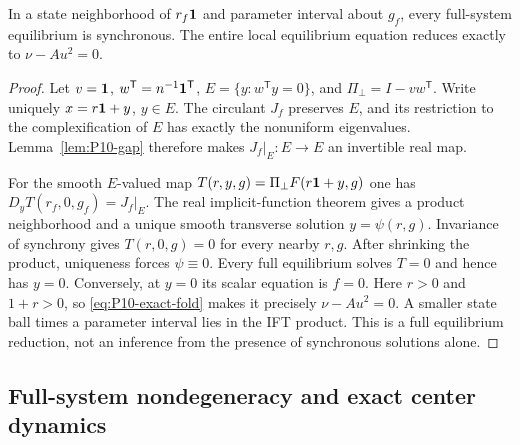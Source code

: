 \begin{proposition}
\label{prop:P10-reduction}
In a state neighborhood of $r_f\mathbf{1}$ and parameter interval about
$g_f$, every full-system equilibrium is synchronous. The entire local
equilibrium equation reduces exactly to $\nu-Au^2=0$.
\end{proposition}
\begin{proof}
Let $v=\mathbf{1}$, $w^{\mathsf T}=n^{-1}\mathbf{1}^{\mathsf T}$,
$E=\{y:w^{\mathsf T}y=0\}$, and $\Pi_\perp=I-vw^{\mathsf T}$.
Write uniquely $x=r\mathbf{1}+y$, $y\in E$. The circulant $J_f$
preserves $E$, and its restriction to the complexification of $E$
has exactly the nonuniform eigenvalues. Lemma~\ref{lem:P10-gap}
therefore makes $J_f|_E:E\to E$ an invertible real map.

For the smooth $E$-valued map
$T(r,y,g)=\Pi_\perp F(r\mathbf{1}+y,g)$ one has
$D_yT(r_f,0,g_f)=J_f|_E$. The real implicit-function theorem gives
a product neighborhood and a unique smooth transverse solution
$y=\psi(r,g)$. Invariance of synchrony gives $T(r,0,g)=0$ for
every nearby $r,g$. After shrinking the product, uniqueness forces
$\psi\equiv0$. Every full equilibrium solves $T=0$ and hence has
$y=0$. Conversely, at $y=0$ its scalar equation is $f=0$.
Here $r>0$ and $1+r>0$, so \eqref{eq:P10-exact-fold} makes it
precisely $\nu-Au^2=0$. A smaller state ball times a parameter
interval lies in the IFT product. This is a full equilibrium reduction,
not an inference from the presence of synchronous solutions alone.
\end{proof}

\subsection{Full-system nondegeneracy and exact center dynamics}

